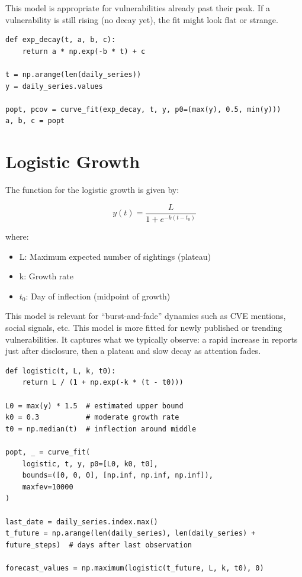 \documentclass[]{article}
\begin{document}
This model is appropriate for vulnerabilities already past their peak.
If a vulnerability is still rising (no decay yet), the fit might look flat or strange.


\begin{lstlisting}[style=Python, caption=Fitting the exponential decay model]
def exp_decay(t, a, b, c):
    return a * np.exp(-b * t) + c

t = np.arange(len(daily_series))
y = daily_series.values

popt, pcov = curve_fit(exp_decay, t, y, p0=(max(y), 0.5, min(y)))
a, b, c = popt
\end{lstlisting}



\section{Logistic Growth}
The function for the logistic growth is given by:

\begin{equation}
y(t) = \frac{L}{1 + e^{-k(t-t_0)}}
\end{equation}

where:
\begin{itemize}
    \item L: Maximum expected number of sightings (plateau)
    \item k: Growth rate
    \item $t_0$: Day of inflection (midpoint of growth)
\end{itemize}

This model is relevant for “burst-and-fade” dynamics such as CVE mentions, social signals, etc.
This model is more fitted for newly published or trending vulnerabilities.
It captures what we typically observe: a rapid increase in reports just after disclosure,
then a plateau and slow decay as attention fades.


\begin{lstlisting}[style=Python, caption=Fitting the logistic model with initial guess for parameters]
def logistic(t, L, k, t0):
    return L / (1 + np.exp(-k * (t - t0)))

L0 = max(y) * 1.5  # estimated upper bound
k0 = 0.3           # moderate growth rate
t0 = np.median(t)  # inflection around middle

popt, _ = curve_fit(
    logistic, t, y, p0=[L0, k0, t0],
    bounds=([0, 0, 0], [np.inf, np.inf, np.inf]),
    maxfev=10000
)

last_date = daily_series.index.max()
t_future = np.arange(len(daily_series), len(daily_series) + future_steps)  # days after last observation

forecast_values = np.maximum(logistic(t_future, L, k, t0), 0)
\end{lstlisting}
\end{document}
